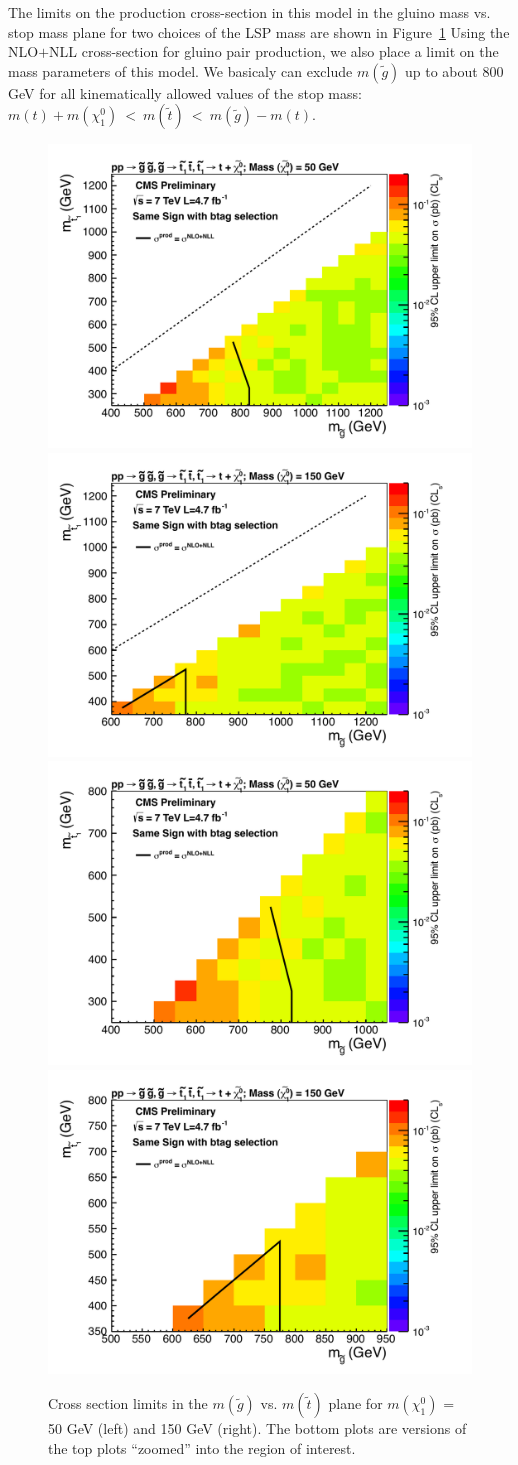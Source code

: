 The limits on the production cross-section in this model in the 
gluino mass vs. stop mass plane for two choices of the 
LSP mass are shown in Figure~\ref{fig:mglinoStop}
Using the 
NLO$+$NLL cross-section for gluino pair production, we also place a limit
on the mass parameters of this model.  We basicaly can exclude 
$m(\widetilde{g})$ up to about 800 GeV for all kinematically allowed
values of the stop mass: 
$m(t)+m(\chi^0_1)~<~m(\widetilde{t})~<~m(\widetilde{g})-m(t)$. 



\begin{figure}[htb]
\begin{center}
\includegraphics[width=0.47\linewidth]{figs/gluinostop50.pdf}
\includegraphics[width=0.47\linewidth]{figs/gluinostop150.pdf}
\includegraphics[width=0.47\linewidth]{figs/gluinostop50_zoom.pdf}
\includegraphics[width=0.47\linewidth]{figs/gluinostop150_zoom.pdf}
\caption{Cross section limits in the $m(\widetilde{g})$ vs. $m(\widetilde{t})$ plane
for $m(\chi_1^0)$ = 50 GeV (left) and 150 GeV (right).  
The bottom plots are versions of the top plots ``zoomed'' into the region
of interest.
\label{fig:mglinoStop}}
\end{center}
\end{figure}


